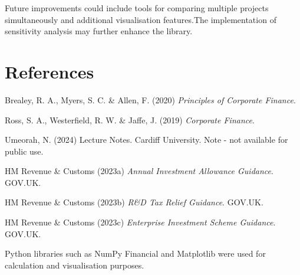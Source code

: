 \documentclass[10pt]{article}
\begin{document}
Future improvements could include tools for comparing multiple projects simultaneously and additional visualisation features.The implementation of sensitivity analysis may further enhance the library.

\section*{References}

Brealey, R. A., Myers, S. C. \& Allen, F. (2020) \textit{Principles of Corporate Finance}.  

Ross, S. A., Westerfield, R. W. \& Jaffe, J. (2019) \textit{Corporate Finance}.  

Umeorah, N. (2024) Lecture Notes. Cardiff University. Note - not available for public use.

HM Revenue \& Customs (2023a) \textit{Annual Investment Allowance Guidance}. GOV.UK.  

HM Revenue \& Customs (2023b) \textit{R\&D Tax Relief Guidance}. GOV.UK.  

HM Revenue \& Customs (2023c) \textit{Enterprise Investment Scheme Guidance}. GOV.UK.  

Python libraries such as NumPy Financial and Matplotlib were used for calculation and visualisation purposes.
\end{document}
